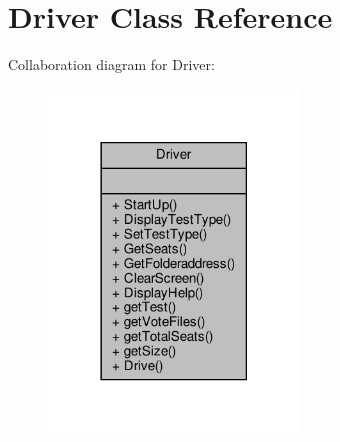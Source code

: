 \hypertarget{classDriver}{}\section{Driver Class Reference}
\label{classDriver}


Collaboration diagram for Driver\+:\nopagebreak
\begin{figure}[H]
\begin{center}
\leavevmode
\includegraphics[width=189pt]{classDriver__coll__graph}
\end{center}
\end{figure}
